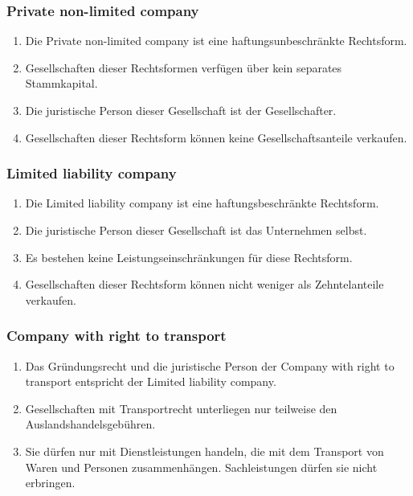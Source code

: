 \documentclass{article}
\begin{document}
\subsubsection{Private non-limited company}
\begin{enumerate}[(1)]
    \item Die Private non-limited company ist eine haftungsunbeschränkte Rechtsform.
    \item Gesellschaften dieser Rechtsformen verfügen über kein separates Stammkapital.
    \item Die juristische Person dieser Gesellschaft ist der Gesellschafter.
    \item Gesellschaften dieser Rechtsform können keine Gesellschaftsanteile verkaufen.
\end{enumerate}

\subsubsection{Limited liability company}\label{llc}
\begin{enumerate}[(1)]
    \item Die Limited liability company ist eine haftungsbeschränkte Rechtsform.
    \item Die juristische Person dieser Gesellschaft ist das Unternehmen selbst.
    \item Es bestehen keine Leistungseinschränkungen für diese Rechtsform.
    \item Gesellschaften dieser Rechtsform können nicht weniger als Zehntelanteile verkaufen.
\end{enumerate}

\subsubsection{Company with right to transport}
\begin{enumerate}[(1)]
    \item Das Gründungsrecht und die juristische Person der Company with right to transport entspricht der Limited liability company.
    \item Gesellschaften mit Transportrecht unterliegen nur teilweise den Auslandshandelsgebühren.
    \item Sie dürfen nur mit Dienstleistungen handeln, die mit dem Transport von Waren und Personen zusammenhängen. Sachleistungen dürfen sie nicht erbringen. 
\end{enumerate}
\end{document}
